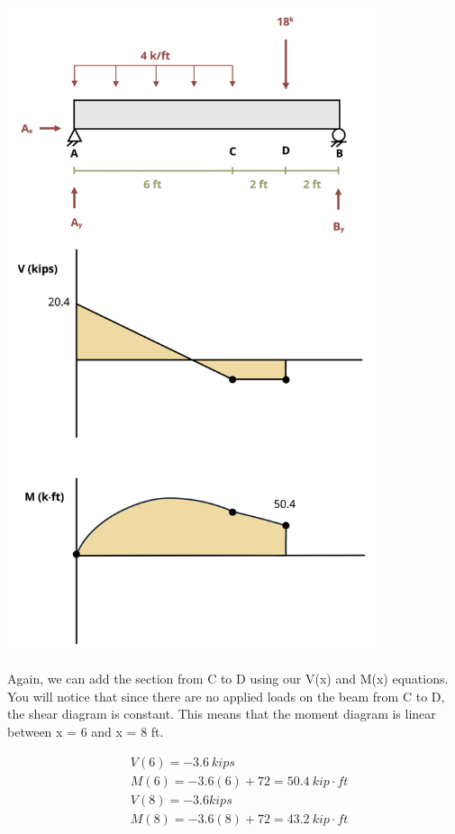 \documentclass[
  letterpaper,
  DIV=11,
  numbers=noendperiod]{scrreprt}
\begin{document}
\begin{tcolorbox}
\begin{tcolorbox}
\begin{center}
\includegraphics[width=4.27083in,height=\textheight]{images/CH7 PNGs/example 7.2 part 7.png}
\end{center}

Again, we can add the section from C to D using our V(x) and M(x)
equations. You will notice that since there are no applied loads on the
beam from C to D, the shear diagram is constant. This means that the
moment diagram is linear between x = 6 and x = 8 ft.

\[
\begin{aligned}
&V(6)=-3.6{~kips} \\
&M(6)=-3.6(6)+72=50.4{~kip}\cdot{ft} \\
&V(8)=-3.6 {kips} \\
&M(8)=-3.6(8)+72=43.2{~kip}\cdot{ft} \\
\end{aligned}
\]


\end{tcolorbox}
\end{tcolorbox}
\end{document}
